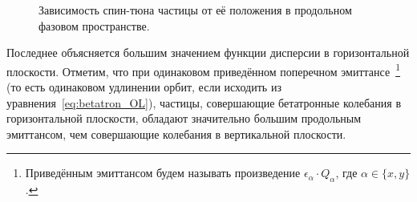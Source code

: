 \begin{figure}[H]
	\centering
	\caption{Зависимость спин-тюна частицы от её положения в продольном фазовом пространстве.\label{fig:main}}
\end{figure}

Последнее объясняется большим значением функции дисперсии в горизонтальной плоскости. Отметим, что при одинаковом приведённом поперечном эмиттансе~\footnote{Приведённым эмиттансом будем называть произведение $\epsilon_\alpha\cdot Q_\alpha$, где $\alpha\in\{x,y\}$.} (то есть одинаковом удлинении орбит, если исходить из уравнения~\eqref{eq:betatron_OL}), частицы, совершающие бетатронные колебания в горизонтальной плоскости, обладают значительно большим продольным эмиттансом, чем совершающие колебания в вертикальной плоскости.

